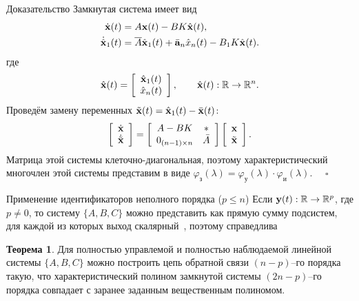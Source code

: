 \documentclass[notheorems,aspectratio=169]{beamer}
\theoremstyle{definition}
\newtheorem{theorem}{Теорема}
\begin{document}
\begin{frame}{Доказательство}
  Замкнутая система имеет вид
  \begin{equation*}
    \begin{aligned}
      \dot{\vb{x}}(t) &= A \vb{x}(t) - BK \hat{\vb{x}}(t), \\
      \dot{\hat{\vb{x}}}_1(t) &= \overline{A} \hat{\vb{x}}_1(t) + \bar{\vb{a}}_n \hat{x}_n(t) - B_1 K \hat{\vb{x}}(t).
    \end{aligned}
  \end{equation*}
  где
  \begin{equation*}
    \hat{\vb{x}}(t) =
    \left[
      \begin{array}{c}
        \hat{\vb{x}}_1(t) \\
        \hat{x}_n(t)
      \end{array}
      \right], \qquad \hat{\vb{x}}(t): \mathbb{R} \to \mathbb{R}^n.
  \end{equation*}
  Проведём замену переменных $\tilde{\vb{x}}(t) = \hat{\vb{x}}_1(t) - \bar{\vb{x}}(t)$:
  \begin{equation*}
    \left[
      \begin{array}{c}
        \dot{\vb{x}} \\
        \dot{\tilde{\vb{x}}}
      \end{array}
      \right]
    =
    \left[
      \begin{array}{cc}
        A - BK & \ast \\
        0_{(n-1) \times n} & \bar{A}
      \end{array}
      \right]
    \left[
      \begin{array}{c}
        \vb{x} \\
        \tilde{\vb{x}}
      \end{array}
      \right].
  \end{equation*}
  Матрица этой системы клеточно-диагональная, поэтому характеристический многочлен этой системы представим в виде
  $\varphi_{\text{з}}(\lambda) = \varphi_{\text{у}}(\lambda) \cdot \varphi_{\text{и}}(\lambda)$. $\quad \square$
\end{frame}

\begin{frame}{Применение идентификаторов неполного порядка ($p \leqslant n$)}
  Если $\vb{y}(t) : \mathbb{R} \to \mathbb{R}^p$, где $p \neq 0$, то
  систему $\{A, B, C\}$ можно представить как прямую сумму подсистем, для каждой из
  которых выход скалярный~\cite{Andreev1976}, поэтому справедлива
  \begin{theorem}
    Для полностью управлемой и полностью наблюдаемой линейной системы $\{A, B, C\}$ можно построить цепь
    обратной связи $(n-p)$--го порядка такую, что характеристический полином замкнутой системы
    $(2n-p)$--го порядка совпадает с заранее заданным вещественным полиномом.
  \end{theorem}
\end{frame}
\end{document}
